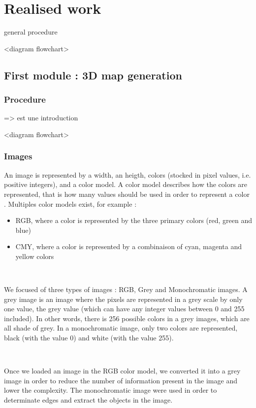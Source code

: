 \chapter{Realised work}

general procedure 

<diagram flowchart>


\section{First module : 3D map generation}


\subsection{Procedure}

=> est une introduction 

<diagram flowchart>


\subsection{Images}

An image is represented by a width, an heigth, colors (stocked in pixel values, i.e. positive integers), and a color model. A color model describes how the colors are represented, that is how many values should be used in order to represent a color \cite{bib:image:ColorModel}. Multiples color models exist, for example : 
\begin{itemize}
	\item RGB, where a color is represented by the three primary colors (red, green and blue)
	\item CMY, where a color is represented by a combinaison of cyan, magenta and yellow colors
\end{itemize}


~~

We focused of three types of images : RGB, Grey and Monochromatic images. A grey image is an image where the pixels are represented in a grey scale by only one value, the grey value (which can have any integer values between 0 and 255 included). In other words, there is 256 possible colors in a grey images, which are all shade of grey. In a monochromatic image, only two colors are represented, black (with the value 0) and white (with the value 255).

~~

Once we loaded an image in the RGB color model, we converted it into a grey image in order to reduce the number of information present in the image and lower the complexity. The monochromatic image were used in order to determinate edges and extract the objects in the image.

